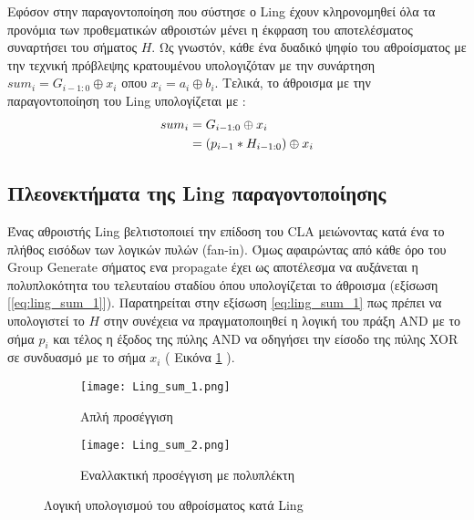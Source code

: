 Εφόσον στην παραγοντοποίηση που σύστησε ο Ling έχουν κληρονομηθεί όλα τα προνόμια 
των προθεματικών αθροιστών μένει η έκφραση του αποτελέσματος συναρτήσει του σήματος $H$.
Ως γνωστόν, κάθε ένα δυαδικό ψηφίο του αθροίσματος με την τεχνική πρόβλεψης κρατουμένου 
υπολογιζόταν με την συνάρτηση $sum_i = G_{i-1:0} \oplus x_i $ οπου $x_i = a_i \oplus b_i$.
Τελικά, το άθροισμα με την παραγοντοποίηση του Ling υπολογίζεται με :
\begin{equation}
\label{eq:ling_sum_1}
\equationame{άθροισμα κατά Ling}
\begin{split}
    sum_i &= G_{i-1:0} \oplus x_i \\
          &= (p_{i-1} * H_{i-1:0}) \oplus x_i
\end{split}
\end{equation}












\subsection{Πλεονεκτήματα της Ling παραγοντοποίησης}
Ένας αθροιστής Ling βελτιστοποιεί την επίδοση του CLA μειώνοντας κατά ένα το πλήθος 
εισόδων των λογικών πυλών (fan-in). Όμως αφαιρώντας από κάθε όρο του Group Generate 
σήματος ενα propagate έχει ως αποτέλεσμα να αυξάνεται η πολυπλοκότητα του τελευταίου 
σταδίου όπου υπολογίζεται το άθροισμα (εξίσωση [\ref{eq:ling_sum_1}]). 
Παρατηρείται στην εξίσωση \ref{eq:ling_sum_1} πως πρέπει να υπολογιστεί το $H$ 
στην συνέχεια να πραγματοποιηθεί η λογική του πράξη AND με το σήμα $p_i$ και τέλος
η έξοδος της πύλης AND να οδηγήσει την είσοδο της πύλης XOR σε συνδυασμό με το
σήμα $x_i$ ( Εικόνα \ref{fig:Ling_sum_1} ).

\begin{figure}[H]
    \centering
    \begin{subfigure}{.4\textwidth}
        \centering
        \texttt{[image: Ling\_sum\_1.png]}
        \caption{Απλή προσέγγιση}
        \label{fig:Ling_sum_1}
    \end{subfigure}
    \begin{subfigure}{.4\textwidth}
        \centering
        \texttt{[image: Ling\_sum\_2.png]}
        \caption{Εναλλακτική προσέγγιση με πολυπλέκτη}
        \label{fig:Ling_sum_2}
    \end{subfigure}
    \caption{Λογική υπολογισμού του αθροίσματος κατά Ling}
    \label{fig:Ling_sum}
\end{figure}


